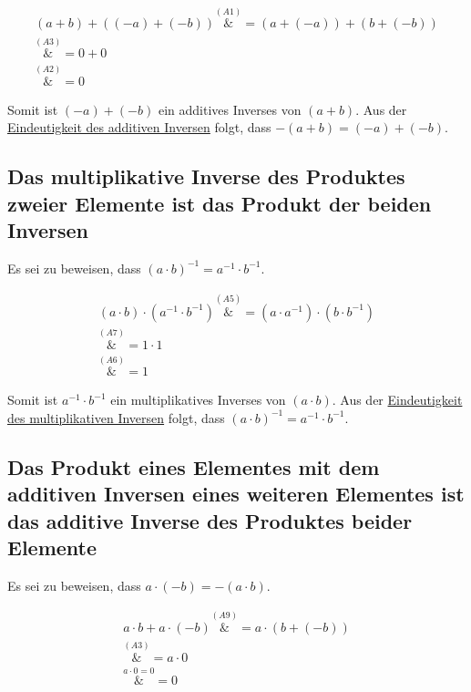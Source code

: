 \documentclass{article}
\begin{document}
\begin{align*}
  (a + b) + ((-a) + (-b)) \overset{\hyperref[a1]{(A1)}}&= (a + (-a)) + (b + (-b)) \\
                          \overset{\hyperref[a3]{(A3)}}&= 0 + 0 \\
                          \overset{\hyperref[a2]{(A2)}}&= 0
\end{align*}

Somit ist $(-a) + (-b)$ ein additives Inverses von $(a + b)$. Aus der
\hyperref[eindeutigkeit_add_inv]{Eindeutigkeit des additiven Inversen}
folgt, dass $-(a + b) = (-a) + (-b)$.

\subsection{Das multiplikative Inverse des Produktes zweier Elemente ist das Produkt der beiden Inversen}

Es sei zu beweisen, dass $(a \cdot b)^{-1} = a^{-1} \cdot b^{-1}$.

\begin{align*}
  (a \cdot b) \cdot (a^{-1} \cdot b^{-1}) \overset{\hyperref[a5]{(A5)}}&= (a \cdot a^{-1}) \cdot (b \cdot b^{-1}) \\
                                         \overset{\hyperref[a7]{(A7)}}&= 1 \cdot 1 \\
                                         \overset{\hyperref[a6]{(A6)}}&= 1
\end{align*}

Somit ist $a^{-1} \cdot b^{-1}$ ein multiplikatives Inverses von $(a \cdot b)$. Aus der
\hyperref[eindeutigkeit_mul_inv]{Eindeutigkeit des multiplikativen Inversen}
folgt, dass $(a \cdot b)^{-1} = a^{-1} \cdot b^{-1}$.

\subsection{Das Produkt eines Elementes mit dem additiven Inversen eines weiteren Elementes ist das additive Inverse des Produktes beider Elemente}
\label{prod_add_inv}

Es sei zu beweisen, dass $a \cdot (-b) = -(a \cdot b)$.

\begin{align*}
  a \cdot b + a \cdot (-b) \overset{\hyperref[a9]{(A9)}}&= a \cdot (b + (-b)) \\
                           \overset{\hyperref[a3]{(A3)}}&= a \cdot 0 \\
                           \overset{\hyperref[ab0:right]{a \cdot 0 = 0}}&= 0
\end{align*}
\end{document}
